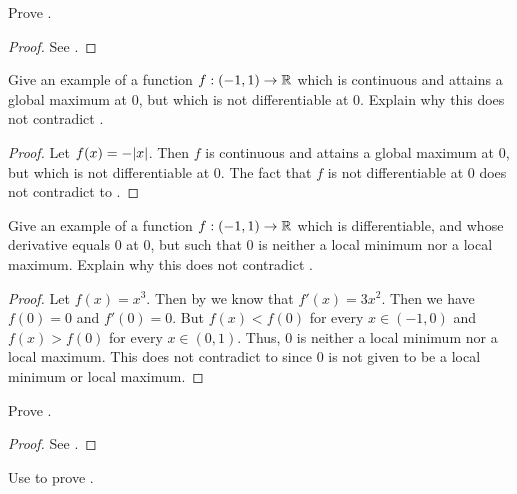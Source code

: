 \exercisesection

\begin{ex}\label{i:ex:10.2.1}
  Prove .
\end{ex}

\begin{proof}
  See .
\end{proof}

\begin{ex}\label{i:ex:10.2.2}
  Give an example of a function \(f : (-1, 1) \to \mathbb{R}\) which is continuous and attains a global maximum at \(0\), but which is not differentiable at \(0\).
  Explain why this does not contradict .
\end{ex}

\begin{proof}
  Let \(f(x) = -\abs{x}\).
  Then \(f\) is continuous and attains a global maximum at \(0\), but which is not differentiable at \(0\).
  The fact that \(f\) is not differentiable at \(0\) does not contradict to .
\end{proof}

\begin{ex}\label{i:ex:10.2.3}
  Give an example of a function \(f : (-1, 1) \to \mathbb{R}\) which is differentiable, and whose derivative equals \(0\) at \(0\), but such that \(0\) is neither a local minimum nor a local maximum.
  Explain why this does not contradict .
\end{ex}

\begin{proof}
  Let \(f(x) = x^3\).
  Then by  we know that \(f'(x) = 3x^2\).
  Then we have \(f(0) = 0\) and \(f'(0) = 0\).
  But \(f(x) < f(0)\) for every \(x \in (-1, 0)\) and \(f(x) > f(0)\) for every \(x \in (0, 1)\).
  Thus, \(0\) is neither a local minimum nor a local maximum.
  This does not contradict to  since \(0\) is not given to be a local minimum or local maximum.
\end{proof}

\begin{ex}\label{i:ex:10.2.4}
  Prove .
\end{ex}

\begin{proof}
  See .
\end{proof}

\begin{ex}\label{i:ex:10.2.5}
  Use  to prove .
\end{ex}

